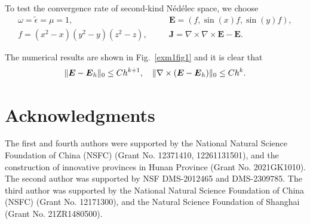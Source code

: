 \documentclass[mathpazo]{cicp}
\begin{document}
To test the convergence rate of second-kind N\'ed\'elec space, we choose 
\begin{align*}
&\omega  = \tilde \epsilon = \mu = 1, & \quad & \boldsymbol E = (f, \sin(x)f, \sin(y)f),&\\
& f = (x^2-x)(y^2-y)(z^2-z),& \quad & \boldsymbol J  = \nabla\times\nabla\times \boldsymbol E - \boldsymbol E. &
\end{align*}

The numerical results are shown in Fig.~\ref{exm1fig1} and it is clear that 
$$
\|\boldsymbol E-\boldsymbol E_h\|_{0} \leq C h^{k+1}, \quad \|\nabla\times(\boldsymbol E-\boldsymbol E_h)\|_{0} \leq C h^k.
$$


\section*{Acknowledgments}
The first and fourth authors were supported by the National Natural Science
Foundation of China (NSFC) (Grant No. 12371410, 12261131501), and the
construction of innovative provinces in Hunan Province (Grant No. 2021GK1010).
The second author was supported by NSF DMS-2012465 and DMS-2309785. The third
author was supported by the National Natural Science Foundation of China (NSFC)
(Grant No. 12171300), and the Natural Science Foundation of Shanghai (Grant No.
21ZR1480500).





\end{document}
